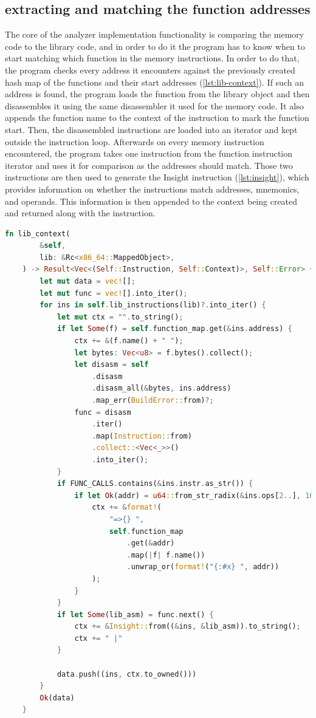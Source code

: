 \subsection{extracting and matching the function addresses}

The core of the analyzer implementation functionality is comparing the memory code to the library code, and in order to do it the program has to know when to start matching which function in the memory instructions. 
In order to do that, the program checks every address it encounters against the previously created hash map of the functions and their start addresses (\autoref{lst:lib-context}).
If such an address is found, the program loads the function from the library object and then disassembles it using the same disassembler it used for the memory code.
It also appends the function name to the context of the instruction to mark the function start.
Then, the disassembled instructions are loaded into an iterator and kept outside the instruction loop.
Afterwards on every memory instruction encountered, the program takes one instruction from the function instruction iterator and uses it for comparison as the addresses should match. 
Those two instructions are then used to generate the Insight instruction (\autoref{lst:insight}), which provides information on whether the instructions match addresses, mnemonics, and operands.
This information is then appended to the context being created and returned along with the instruction.

\begin{lstlisting}[caption=\label{lst:lib-context}"Function for providing conxtextualized library instructions", language=Rust]
    fn lib_context(
        &self,
        lib: &Rc<x86_64::MappedObject>,
    ) -> Result<Vec<(Self::Instruction, Self::Context)>, Self::Error> {
        let mut data = vec![];
        let mut func = vec![].into_iter();
        for ins in self.lib_instructions(lib)?.into_iter() {
            let mut ctx = "".to_string();
            if let Some(f) = self.function_map.get(&ins.address) {
                ctx += &(f.name() + " ");
                let bytes: Vec<u8> = f.bytes().collect();
                let disasm = self
                    .disasm
                    .disasm_all(&bytes, ins.address)
                    .map_err(BuildError::from)?;
                func = disasm
                    .iter()
                    .map(Instruction::from)
                    .collect::<Vec<_>>()
                    .into_iter();
            }
            if FUNC_CALLS.contains(&ins.instr.as_str()) {
                if let Ok(addr) = u64::from_str_radix(&ins.ops[2..], 16) {
                    ctx += &format!(
                        "=>{} ",
                        self.function_map
                            .get(&addr)
                            .map(|f| f.name())
                            .unwrap_or(format!("{:#x} ", addr))
                    );
                }
            }
            if let Some(lib_asm) = func.next() {
                ctx += &Insight::from((&ins, &lib_asm)).to_string();
                ctx += " |"
            }

            data.push((ins, ctx.to_owned()))
        }
        Ok(data)
    }
\end{lstlisting}

